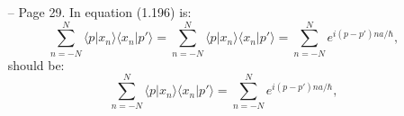 \documentclass[a4paper,11pt]{article}
\begin{document}
\begin{itemize}
\item[--] Page 29. In equation (1.196) is:
\begin{displaymath}
\sum_{ n = -N }^{ N } \langle p | x_{ n } \rangle \langle x_{ n } | p' \rangle = \sum_{ n = -N }^{ N } \langle p | x_{ n } \rangle \langle x_{ n } | p' \rangle = \sum_{ n = -N }^{ N } e^{ i( p - p' ) na / \hbar },
\end{displaymath}
should be:
\begin{displaymath}
\sum_{ n = -N }^{ N } \langle p | x_{ n } \rangle \langle x_{ n } | p' \rangle = \sum_{ n = -N }^{ N } e^{ i( p - p' ) na / \hbar },
\end{displaymath}
\end{itemize}




{}
\end{document}
